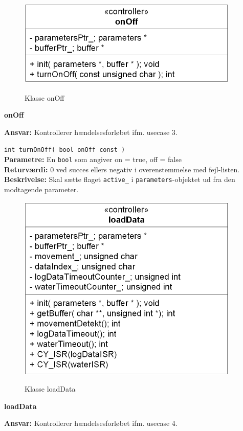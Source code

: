\begin{figure}[htbp] \centering
{\includegraphics[scale=1.3]{filer/design/Klassediagrammer/sw_psoc_onOff}}
\caption{Klasse onOff}
\label{fig:sw_psoc_class_onOff}
\end{figure} 

{\centering
\textbf{onOff}\par
}
\textbf{Ansvar:} Kontrollerer hændelsesforløbet ifm. usecase 3. \

\verb+int turnOnOff( bool onOff const )+ \\
\textbf{Parametre:} En \verb+bool+ som angiver on = true, off = false \\
\textbf{Returværdi:} 0 ved succes ellers negativ i overenstemmelse med fejl-listen. \\
\textbf{Beskrivelse:} Skal sætte flaget \verb+active_+ i \verb+parameters+-objektet ud fra den modtagende parameter.\\

\begin{figure}[htbp] \centering
{\includegraphics[scale=1.3]{filer/design/Klassediagrammer/sw_psoc_loadData}}
\caption{Klasse loadData}
\label{fig:sw_psoc_class_loadData}
\end{figure} 

{\centering
\textbf{loadData}\par
}
\textbf{Ansvar:} Kontrollerer hændelsesforløbet ifm. usecase 4. \

